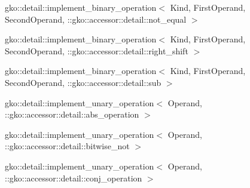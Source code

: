 \begin{DoxyCompactList}
\begin{DoxyCompactList}
\end{DoxyCompactList}
\item gko\+:\+:detail\+:\+:implement\+\_\+binary\+\_\+operation$<$ Kind, First\+Operand, Second\+Operand, \+:\+:gko\+:\+:accessor\+:\+:detail\+:\+:not\+\_\+equal $>$\begin{DoxyCompactList}
\item {}
\end{DoxyCompactList}
\item gko\+:\+:detail\+:\+:implement\+\_\+binary\+\_\+operation$<$ Kind, First\+Operand, Second\+Operand, \+:\+:gko\+:\+:accessor\+:\+:detail\+:\+:right\+\_\+shift $>$\begin{DoxyCompactList}
\item {}
\end{DoxyCompactList}
\item gko\+:\+:detail\+:\+:implement\+\_\+binary\+\_\+operation$<$ Kind, First\+Operand, Second\+Operand, \+:\+:gko\+:\+:accessor\+:\+:detail\+:\+:sub $>$\begin{DoxyCompactList}
\item {}
\end{DoxyCompactList}
\item gko\+:\+:detail\+:\+:implement\+\_\+unary\+\_\+operation$<$ Operand, \+:\+:gko\+:\+:accessor\+:\+:detail\+:\+:abs\+\_\+operation $>$\begin{DoxyCompactList}
\item {}
\end{DoxyCompactList}
\item gko\+:\+:detail\+:\+:implement\+\_\+unary\+\_\+operation$<$ Operand, \+:\+:gko\+:\+:accessor\+:\+:detail\+:\+:bitwise\+\_\+not $>$\begin{DoxyCompactList}
\item {}
\end{DoxyCompactList}
\item gko\+:\+:detail\+:\+:implement\+\_\+unary\+\_\+operation$<$ Operand, \+:\+:gko\+:\+:accessor\+:\+:detail\+:\+:conj\+\_\+operation $>$\begin{DoxyCompactList}

\end{DoxyCompactList}
\end{DoxyCompactList}

